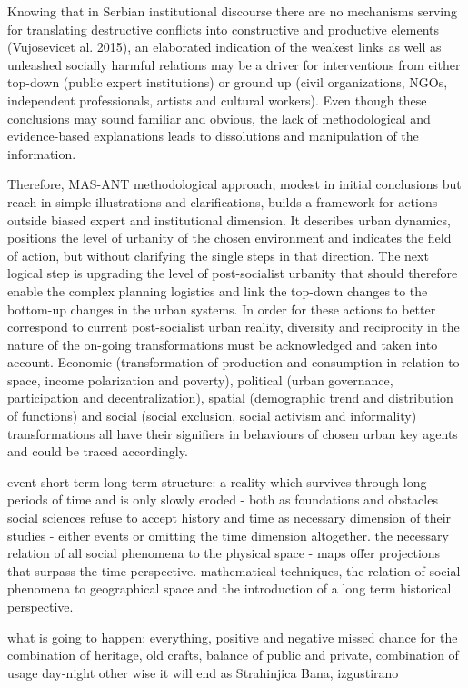 \documentclass[11pt]{report}
\begin{document}
Knowing that in Serbian institutional discourse there are no mechanisms serving for translating destructive conflicts into constructive and productive elements (Vujosevicet al. 2015), an elaborated indication of the weakest links as well as unleashed socially harmful relations may be a driver for interventions from either top-down (public expert institutions) or ground up (civil organizations, NGOs, independent professionals, artists and cultural workers). Even though these conclusions may sound familiar and obvious, the lack of methodological and evidence-based explanations leads to dissolutions and manipulation of the information.

Therefore, MAS-ANT methodological approach, modest in initial conclusions but reach in simple illustrations and clarifications, builds a framework for actions outside biased expert and institutional dimension. It describes urban dynamics, positions the level of urbanity of the chosen environment and indicates the field of action, but without clarifying the single steps in that direction. The next logical step is upgrading the level of post-socialist urbanity that should therefore enable the complex planning logistics and link the top-down changes to the bottom-up changes in the urban systems. In order for these actions to better correspond to current post-socialist urban reality, diversity and reciprocity in the nature of the on-going transformations must be acknowledged and taken into account. Economic (transformation of production and consumption in relation to space, income polarization and poverty), political (urban governance, participation and decentralization), spatial (demographic trend and distribution of functions) and social (social exclusion, social activism and informality) transformations all have their signifiers in behaviours of chosen urban key agents and could be traced accordingly.

\cite{Braudel 1970}
event-short term-long term
structure: a  reality which survives through long periods of time and is only slowly eroded - both as foundations and obstacles
social sciences refuse to accept history and time as necessary dimension of their studies - either events or omitting the time dimension altogether.
the necessary relation of all  social phenomena  to the physical space - maps offer projections that surpass the time perspective.
mathematical  techniques,  the  relation of social phenomena  to  geographical space and the introduction of  a  long term historical perspective.

what is going to happen: everything, positive and negative
missed chance for the combination of heritage, old crafts, balance of public and private, combination of usage day-night
other wise it will end as Strahinjica Bana, izgustirano
   
\end{document}
